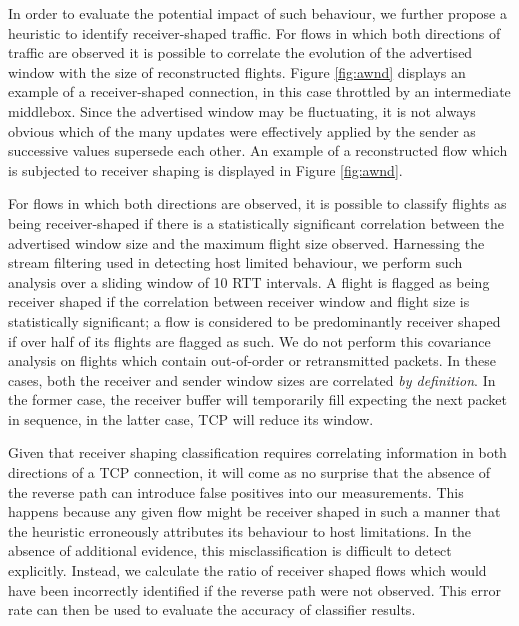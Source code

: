 In order to evaluate the potential impact of such behaviour, we further propose a heuristic to identify receiver-shaped traffic.
For flows in which both directions of traffic are observed it is possible to correlate the evolution of the advertised window with the size of reconstructed flights.
Figure \ref{fig:awnd} displays an example of a receiver-shaped connection, in this case throttled by an intermediate middlebox.
Since the advertised window may be fluctuating, it is not always obvious which of the many updates were effectively applied by the sender as successive values supersede each other.
An example of a reconstructed flow which is subjected to receiver shaping is displayed in Figure \ref{fig:awnd}.

For flows in which both directions are observed, it is possible to classify flights as being receiver-shaped if there is a statistically significant correlation between the advertised window size and the maximum flight size observed.
Harnessing the stream filtering used in detecting host limited behaviour, we perform such analysis over a sliding window of 10 RTT intervals.
A flight is flagged as being receiver shaped if the correlation between receiver window and flight size is statistically significant; a flow is considered to be predominantly receiver shaped if over half of its flights are flagged as such.
We do not perform this covariance analysis on flights which contain out-of-order or retransmitted packets. In these cases, both the receiver and sender window sizes are correlated \emph{by definition}. In the former case, the receiver buffer will temporarily fill expecting the next packet in sequence, in the latter case, TCP will reduce its window.

Given that receiver shaping classification requires correlating information in both directions of a TCP connection, it will come as no surprise that the absence of the reverse path can introduce false positives into our measurements. This happens because any given flow might be receiver shaped in such a manner that the heuristic erroneously attributes its behaviour to host limitations. In the absence of additional evidence, this misclassification is difficult to detect explicitly. Instead, we calculate the ratio of receiver shaped flows which would have been incorrectly identified if the reverse path were not observed. This error rate can then be used to evaluate the accuracy of classifier results.

